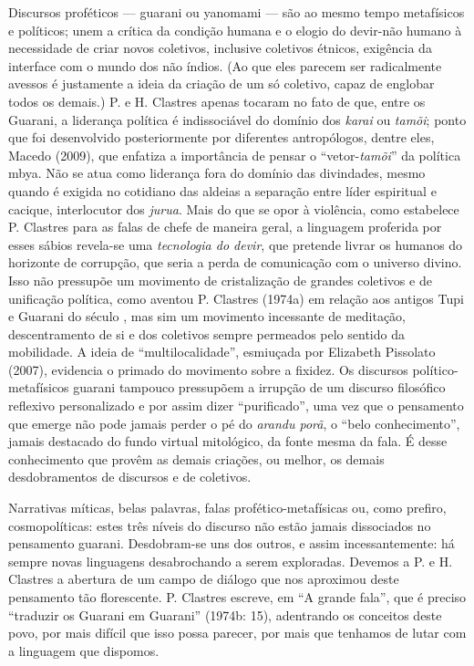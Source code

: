 {{Discursos proféticos --- guarani ou yanomami --- são ao mesmo tempo
metafísicos e políticos; unem a crítica da condição humana e o elogio
do devir-não humano à necessidade de criar novos coletivos, inclusive
coletivos étnicos, exigência da interface com o mundo dos não índios.
(Ao que eles parecem ser radicalmente avessos é justamente a ideia da
criação de um só coletivo, capaz de englobar todos os demais.) P. e H.
Clastres apenas tocaram no fato de que, entre os Guarani, a liderança
política é indissociável do domínio dos \emph{karai} ou \emph{tamõi}; ponto que foi
desenvolvido posteriormente por diferentes antropólogos, dentre eles,
Macedo (2009), que enfatiza a importância de pensar o ``vetor-\emph{tamõi}'' da
política mbya. Não se atua como liderança fora do domínio das
divindades, mesmo quando é exigida no cotidiano das aldeias a separação
entre líder espiritual e cacique, interlocutor dos \emph{jurua}. Mais do que
se opor à violência, como estabelece P. Clastres para as falas de chefe
de maneira geral, a linguagem proferida por esses sábios revela-se uma
\emph{tecnologia do devir}, que pretende livrar os humanos do horizonte de
corrupção, que seria a perda de comunicação com o universo divino. Isso
não pressupõe um movimento de cristalização de grandes coletivos e de
unificação política, como aventou P. Clastres (1974a) em relação aos
antigos Tupi e Guarani do século , mas sim um movimento incessante
de meditação, descentramento de si e dos coletivos sempre permeados
pelo sentido da mobilidade. A ideia de ``multilocalidade'', esmiuçada por
Elizabeth Pissolato (2007), evidencia o primado do movimento sobre a
fixidez. Os discursos político-metafísicos guarani tampouco pressupõem
a irrupção de um discurso filosófico reflexivo personalizado e por
assim dizer ``purificado'', uma vez que o pensamento que emerge não pode
jamais perder o pé do \emph{arandu porã}, o ``belo conhecimento'', jamais
destacado do fundo virtual mitológico, da fonte mesma da fala. É desse
conhecimento que provêm as demais criações, ou melhor, os demais
desdobramentos de discursos e de coletivos.

Narrativas míticas, belas palavras, falas profético-metafísicas ou, como
prefiro, cosmopolíticas: estes três níveis do discurso não estão jamais
dissociados no pensamento guarani. Desdobram-se uns dos outros, e assim
incessantemente: há sempre novas linguagens desabrochando a serem
exploradas. Devemos a P. e H. Clastres a abertura de um campo de
diálogo que nos aproximou deste pensamento tão florescente. P. Clastres
escreve, em ``A grande fala'', que é preciso ``traduzir os Guarani em
Guarani'' (1974b: 15), adentrando os conceitos deste povo, por mais
difícil que isso possa parecer, por mais que tenhamos de lutar com a
linguagem que dispomos.

}}
